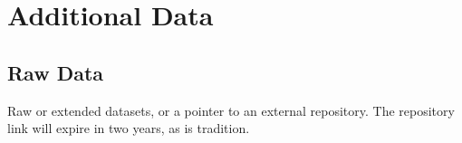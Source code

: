 
\chapter{Additional Data}
\label{app:data}

\section{Raw Data}

Raw or extended datasets, or a pointer to an external repository. The
repository link will expire in two years, as is tradition.
